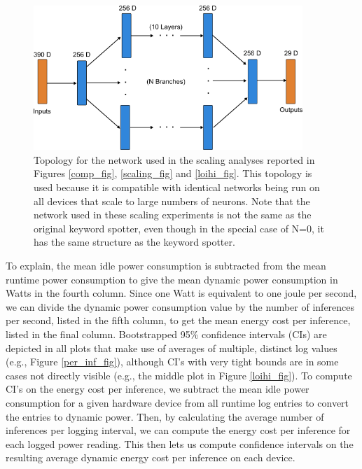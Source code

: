 \documentclass{article}
\begin{document}
\begin{figure}[ht!]
\centering
    \includegraphics[width=4in]{./figures/scaled_network.png}
    \caption{Topology for the network used in the scaling analyses reported in Figures \ref{comp_fig}, \ref{scaling_fig} and \ref{loihi_fig}. This topology is used because it is compatible with identical networks being run on all devices that scale to large numbers of neurons. Note that the network used in these scaling experiments is not the same as the original keyword spotter, even though in the special case of N=0, it has the same structure as the keyword spotter.}
\label{scaled_network_fig}
\end{figure}

To explain, the mean idle power consumption is subtracted from the mean runtime power consumption to give the mean dynamic power consumption in Watts in the fourth column. Since one Watt is equivalent to one joule per second, we can divide the dynamic power consumption value by the number of inferences per second, listed in the fifth column, to get the mean energy cost per inference, listed in the final column. Bootstrapped 95\% confidence intervals (CIs) are depicted in all plots that make use of averages of multiple, distinct log values (e.g., Figure \ref{per_inf_fig}), although CI's with very tight bounds are in some cases not directly visible (e.g., the middle plot in Figure \ref{loihi_fig}). To compute CI's on the energy cost per inference, we subtract the mean idle power consumption for a given hardware device from all runtime log entries to convert the entries to dynamic power. Then, by calculating the average number of inferences per logging interval, we can compute the energy cost per inference for each logged power reading. This then lets us compute confidence intervals on the resulting average dynamic energy cost per inference on each device.
\end{document}
